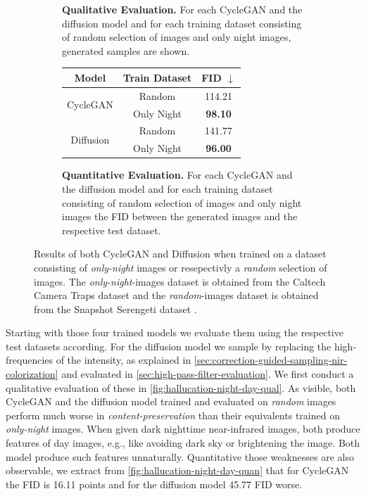 \begin{figure}[htp!]
\begin{subfigure}{\textwidth}
\begin{tabularx}{\textwidth}{Y Y Y !{\space} Y Y Y}
        \end{tabularx}
        \caption{
            \textbf{Qualitative Evaluation.}
            For each CycleGAN and the diffusion model and for each training dataset consisting of random selection of images and only night images,
            generated samples are shown.
        }
        \label{fig:hallucation-night-day-qual}
    \end{subfigure}
    \begin{subfigure}{\textwidth}
        \centering
        \begin{tabular}{c | c | c}
            Model                      & Train Dataset & FID $\downarrow$ \\
            \hline \hline
            \multirow{2}{*}{CycleGAN}  & Random        & 114.21           \\
                                       & Only Night    & \textbf{98.10}   \\
            \hline
            \multirow{2}{*}{Diffusion} & Random        & 141.77           \\
                                       & Only Night    & \textbf{96.00}   \\
        \end{tabular}
        \caption{
            \textbf{Quantitative Evaluation.}
            For each CycleGAN and the diffusion model and for each training dataset consisting of random selection of images and only night images the FID between the generated images and the respective test dataset.
        }
        \label{fig:hallucation-night-day-quan}
    \end{subfigure}
    \caption{
        Results of both CycleGAN and Diffusion when trained on a dataset consisting of \textit{only-night} images or resepectivly a \textit{random} selection of images.
        The \textit{only-night}-images dataset is obtained from the Caltech Camera Traps dataset \parencite{caltech} and the \textit{random}-images dataset is obtained from the Snapshot Serengeti dataset \parencite{serengeti}.
    }
    \label{fig:hallucincation-night-day}
\end{figure}

Starting with those four trained models we evaluate them using the respective test datasets according.
For the diffusion model we sample by replacing the high-frequencies of the intensity, as explained in \autoref{sec:correction-guided-sampling-nir-colorization} and evaluated in \autoref{sec:high-pass-filter-evaluation}.
We first conduct a qualitative evaluation of these in \autoref{fig:hallucation-night-day-qual}.
As visible, both CycleGAN and the diffusion model trained and evaluated on \textit{random} images perform much worse in \textit{content-preservation} than their equivalents trained on \textit{only-night} images.
When given dark nighttime near-infrared images, both produce features of day images, e.g., like avoiding dark sky or brightening the image.
Both model produce such features unnaturally.
Quantitative those weaknesses are also observable, we extract from \autoref{fig:hallucation-night-day-quan} that for CycleGAN the FID is 16.11 points and for the diffusion model 45.77 FID worse.

